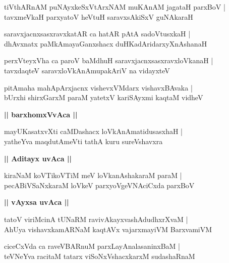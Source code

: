\documentclass[twoside,12pt,openright]{book}
\newcounter{shloka}[chapter]
\def\uvaca#1{\centerline{{\large\textbf{#1}}}}
\begin{document}
\begin{shloka}%
tiVthARnAM puNAyxkeSxVtArxNAM muKAnAM jagataH parxBoV |\\
tavxmeVkaH parxyatoV heVtuH saravxsAkiSxV guNAkaraH 
\end{shloka}

\begin{shloka}%
saravxjacnxsasxravxkatAR ca hatAR pAtA sadoVtusxkaH |\\
dhAvxnatx paMkAmayaGanxshacx duHKadAridarxyXnAshanaH 
\end{shloka}

\begin{shloka}%
perxVteyxVha ca paroV baMdhuH saravxjacnxsasxravxloVkanaH |\\
tavxdaqteV saravxloVkAnAmupakAriV na vidayxteV 
\end{shloka}

\begin{shloka}%
pitAmaha mahApArxjacnx vishevxVMdarx vishavxBAvaka |\\
bUrxhi shirxGarxM paraM yatetxV kariSAyxmi kaqtaM vidheV 
\end{shloka}

\uvaca{|| barxhomxVvAca ||}

\begin{shloka}%
mayUKasatxvXti caMDashacx loVkAnAmatidusasxhaH |\\
yatheYva maqdutAmeVti tathA kuru sureVshavxra
\end{shloka}

\uvaca{|| Aditayx uvAca ||}

\begin{shloka}%
kiraNaM koVTikoVTiM meV loVkanAshakaraM paraM |\\
pecABiVSaNxkaraM loVkeV parxyoVgeVNAciCxda parxBoV
\end{shloka}

\uvaca{|| vAyxsa uvAca ||}

\begin{shloka}%
tatoV viriMcinA tUNaRM ravivAkayxvashAdudhxrXvaM |\\
AhUya vishavxkamARNaM kaqtAVx vajarxmayiVM BarxvamiVM 
\end{shloka}

\begin{shloka}%
ciceCxVda ca raveVBARnuM parxLayAnalasaninxBaM |\\
teVNeYva racitaM tatarx viSoNxVshacxkarxM sudashaRnaM 
\end{shloka}
\end{document}
